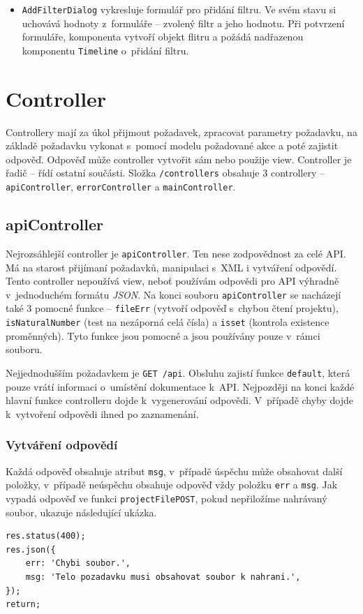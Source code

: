 \begin{itemize}
\item \texttt{AddFilterDialog} vykresluje formulář pro přidání filtru. Ve svém stavu si uchovává hodnoty z~formuláře -- zvolený filtr a jeho hodnotu. Při potvrzení formuláře, komponenta vytvoří objekt flitru a požádá nadřazenou komponentu \texttt{Timeline} o~přidání filtru.
\end{itemize}

\section{Controller}
Controllery mají za úkol přijmout požadavek, zpracovat parametry požadavku, na základě požadavku vykonat s~pomocí modelu požadované akce a poté zajistit odpověď. Odpověď může controller vytvořit sám nebo použije view. Controller je řadič -- řídí ostatní součásti. Složka \texttt{/controllers} obsahuje 3 controllery -- \texttt{apiController}, \texttt{errorController} a \texttt{mainController}.

\subsection{apiController}
Nejrozsáhlejší controller je \texttt{apiController}. Ten nese zodpovědnost za celé API. Má na starost přijímaní požadavků, manipulaci s~XML i vytváření odpovědí. Tento controller nepoužívá view, neboť používám odpovědi pro API výhradně v~jednoduchém formátu \textit{JSON}. Na konci souboru \texttt{apiController} se nacházejí také 3 pomocné funkce -- \texttt{fileErr} (vytvoří odpověď s~chybou čtení projektu), \texttt{isNaturalNumber} (test na nezáporná celá čísla) a \texttt{isset} (kontrola existence proměnných). Tyto funkce jsou pomocné a jsou používány pouze v~rámci souboru.

Nejjednodušším požadavkem je \texttt{GET /api}. Obsluhu zajistí funkce \texttt{default}, která pouze vrátí informaci o~umístění dokumentace k~API. Nejpozději na konci každé hlavní funkce controlleru dojde k~vygenerování odpovědi. V~případě chyby dojde k~vytvoření odpovědi ihned po zaznamenání.

\subsubsection{Vytváření odpovědí}
Každá odpověď obsahuje atribut \texttt{msg}, v~případě úspěchu může obsahovat další položky, v~případě neúspěchu obsahuje odpověď vždy položku \texttt{err} a \texttt{msg}. Jak vypadá odpověď ve funkci \texttt{projectFilePOST}, pokud nepřiložíme nahrávaný soubor, ukazuje následující ukázka.
\begin{lstlisting}[style=JavaScript]
res.status(400);
res.json({
    err: 'Chybi soubor.',
    msg: 'Telo pozadavku musi obsahovat soubor k nahrani.',
});
return;
\end{lstlisting}

